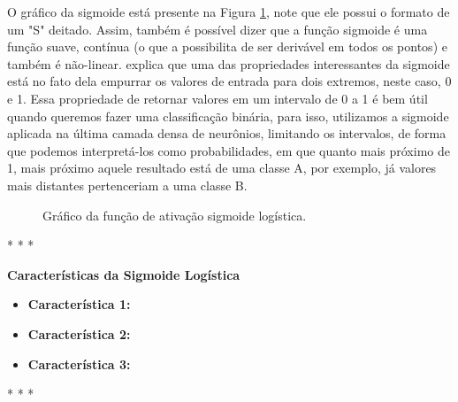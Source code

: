 O gráfico da sigmoide está presente na Figura \ref{fig:sigmoide}, note que ele possui o formato de um "S" deitado. Assim, também é possível dizer que a função sigmoide é uma função suave, contínua (o que a possibilita de ser derivável em todos os pontos) e também é não-linear. \textcite{ActivationFunctionsLederer} explica que uma das propriedades interessantes da sigmoide está no fato dela empurrar os valores de entrada para dois extremos, neste caso, 0 e 1. Essa propriedade de retornar valores em um intervalo de 0 a 1 é bem útil quando queremos fazer uma classificação binária, para isso, utilizamos a sigmoide aplicada na última camada densa de neurônios, limitando os intervalos, de forma que podemos interpretá-los como probabilidades, em que quanto mais próximo de 1, mais próximo aquele resultado está de uma classe A, por exemplo, já valores mais distantes pertenceriam a uma classe B.

\begin{figure}[h!]
    \centering
    \caption{Gráfico da função de ativação sigmoide logística.}
    \label{fig:sigmoide}
\end{figure}

\medskip
\begin{center}
 * * *
\end{center}
\medskip

\textbf{Características da Sigmoide Logística}
\vspace{1em}

\begin{itemize}
    \item \textbf{Característica 1:}
    \item \textbf{Característica 2:}
    \item \textbf{Característica 3:}
\end{itemize}

\medskip
\begin{center}
 * * *
\end{center}
\medskip

